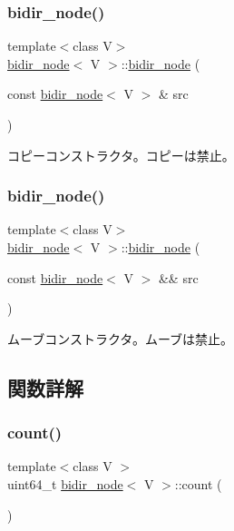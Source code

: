 \subsubsection{\texorpdfstring{bidir\+\_\+node()}{bidir\_node()}\hspace{0.1cm}{\footnotesize\ttfamily [3/4]}}
{\footnotesize\ttfamily template$<$class V$>$ \\
\hyperlink{classbidir__node}{bidir\+\_\+node}$<$ V $>$\+::\hyperlink{classbidir__node}{bidir\+\_\+node} (\begin{DoxyParamCaption}\item[{const \hyperlink{classbidir__node}{bidir\+\_\+node}$<$ V $>$ \&}]{src }\end{DoxyParamCaption})\hspace{0.3cm}{\ttfamily [delete]}}

コピーコンストラクタ。コピーは禁止。 \hypertarget{classbidir__node_a3b3ad0976fcc289d9726572700e02972}{}\label{classbidir__node_a3b3ad0976fcc289d9726572700e02972} 
\subsubsection{\texorpdfstring{bidir\+\_\+node()}{bidir\_node()}\hspace{0.1cm}{\footnotesize\ttfamily [4/4]}}
{\footnotesize\ttfamily template$<$class V$>$ \\
\hyperlink{classbidir__node}{bidir\+\_\+node}$<$ V $>$\+::\hyperlink{classbidir__node}{bidir\+\_\+node} (\begin{DoxyParamCaption}\item[{const \hyperlink{classbidir__node}{bidir\+\_\+node}$<$ V $>$ \&\&}]{src }\end{DoxyParamCaption})\hspace{0.3cm}{\ttfamily [delete]}}

ムーブコンストラクタ。ムーブは禁止。 

\subsection{関数詳解}
\hypertarget{classbidir__node_a9851f8255f82458826f5a4c615de9a2a}{}\label{classbidir__node_a9851f8255f82458826f5a4c615de9a2a} 
\subsubsection{\texorpdfstring{count()}{count()}}
{\footnotesize\ttfamily template$<$class V $>$ \\
uint64\+\_\+t \hyperlink{classbidir__node}{bidir\+\_\+node}$<$ V $>$\+::count (\begin{DoxyParamCaption}{ }\end{DoxyParamCaption})\hspace{0.3cm}{\ttfamily [static]}}

